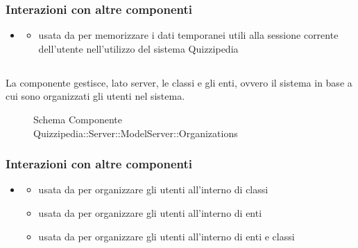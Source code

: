 \subsubsection{Interazioni con altre componenti}
\begin{itemize}
\item {}
\begin{itemize}
\item usata da  per memorizzare i dati temporanei utili alla sessione corrente dell'utente nell'utilizzo del sistema Quizzipedia
\end{itemize}
\end{itemize}
\subsection{}
La componente gestisce, lato server, le classi e gli enti, ovvero il sistema in base a cui sono organizzati gli utenti nel sistema.
\begin{figure}[H]
\centering
\noindent{}
\caption[Schema Componente Quizzipedia::Server::ModelServer::Organizations]{Schema Componente Quizzipedia::Server::ModelServer::Organizations}
\end{figure}
\subsubsection{Interazioni con altre componenti}
\begin{itemize}
\item {}
\begin{itemize}
\item usata da  per organizzare gli utenti all'interno di classi
\item usata da  per organizzare gli utenti all'interno di enti
\item usata da  per organizzare gli utenti all'interno di enti e classi
\end{itemize}
\end{itemize}
